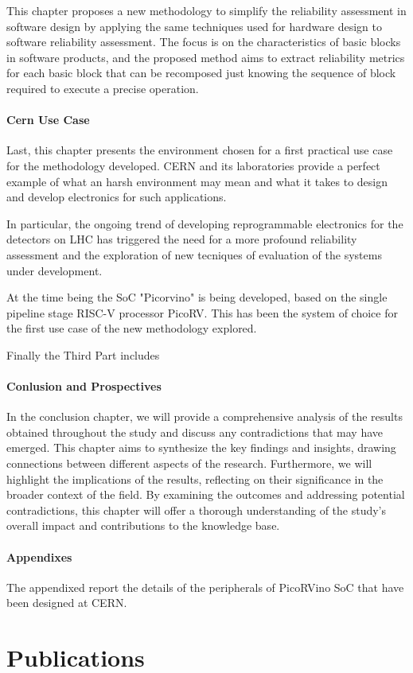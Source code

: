 \documentclass[./dissertation.tex]{subfiles}
\begin{document}
This chapter proposes a new methodology to simplify the reliability assessment in software design by applying the same techniques used for hardware design to software reliability assessment. The focus is on the characteristics of basic blocks in software products, and the proposed method aims to extract reliability metrics for each basic block that can be recomposed just knowing the sequence of block required to execute a precise operation.
\paragraph{Cern Use Case}
Last, this chapter presents the environment chosen for a first practical use case for the methodology developed. CERN and its laboratories provide a perfect example of what an harsh environment may mean and what it takes to design and develop electronics for such applications.

In particular, the ongoing trend of developing reprogrammable electronics for the detectors on LHC has triggered the need for a more profound reliability assessment and the exploration of new tecniques of evaluation of the systems under development.

At the time being the SoC "Picorvino" is being developed, based on the single pipeline stage RISC-V processor PicoRV. This has been the system of choice for the first use case of the new methodology explored.

Finally the Third Part includes
\paragraph{Conlusion and Prospectives}
In the conclusion chapter, we will provide a comprehensive analysis of the results obtained throughout the study and discuss any contradictions that may have emerged. This chapter aims to synthesize the key findings and insights, drawing connections between different aspects of the research. Furthermore, we will highlight the implications of the results, reflecting on their significance in the broader context of the field. By examining the outcomes and addressing potential contradictions, this chapter will offer a thorough understanding of the study's overall impact and contributions to the knowledge base.

\paragraph{Appendixes}
The appendixed report the details of the peripherals of PicoRVino SoC that have been designed at CERN.


\section{Publications}

\newpage
\newpage	
\end{document}
